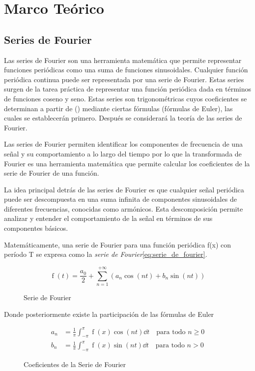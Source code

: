 \section{Marco Teórico }
\subsection{Series de Fourier}

Las series de Fourier son una herramienta matemática que permite representar funciones periódicas como una suma de funciones sinusoidales. Cualquier función periódica continua puede ser representada por una serie de Fourier. Estas series surgen de la tarea práctica de representar una función periódica dada en términos de funciones coseno y seno. Estas series son trigonométricas cuyos coeficientes se determinan a partir de () mediante ciertas fórmulas (fórmulas de Euler), las cuales se establecerán primero. Después se considerará la teoría de las series de Fourier.

Las series de Fourier permiten identificar los componentes de frecuencia de una señal y su comportamiento a lo largo del tiempo por lo que la transformada de Fourier es una herramienta matemática que permite calcular los coeficientes de la serie de Fourier de una función.

La idea principal detrás de las series de Fourier es que cualquier señal periódica puede ser descompuesta en una suma infinita de componentes sinusoidales de diferentes frecuencias, conocidas como armónicos. Esta descomposición permite analizar y entender el comportamiento de la señal en términos de sus componentes básicos.

Matemáticamente, una serie de Fourier para una función periódica f(x) con período T se expresa como la \emph{serie de Fourier}\eqref{eq:serie_de_fourier}.
\begin{figure}[H]
	\begin{equation}
	\operatorname{f}(t) = \frac{a_0}{2} + \sum_{n=1}^{+\infty} (a_n \cos(nt) + b_n \sin(nt))	
	\label{eq:serie_de_fourier}
\end{equation}
\caption{Serie de Fourier}
\end{figure}


Donde posteriormente existe la participación de las fórmulas de Euler

\begin{figure}[H]
	\begin{equation}
		\begin{aligned}
			a_n &= \frac{1}{\pi} \int_{-\pi}^{\pi} \operatorname{f}(x) \cos(nt) \dd{t} \quad \text{para todo } n \geq 0 \\
			b_n &= \frac{1}{\pi} \int_{-\pi}^{\pi} \operatorname{f}(x) \sin(nt) \dd{t} \quad \text{para todo } n > 0
		\end{aligned}
		\label{eq:fourier_coeffs}
	\end{equation}
	\caption{Coeficientes de la Serie de Fourier}
\end{figure}

